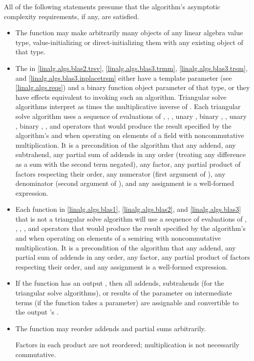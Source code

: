 \pnum
All of the following statements presume
that the algorithm's asymptotic complexity requirements, if any, are satisfied.
\begin{itemize}
\item
The function may make arbitrarily many objects of any linear algebra value type,
value-initializing or direct-initializing them
with any existing object of that type.
\item
The  in
\ref{linalg.algs.blas2.trsv},
\ref{linalg.algs.blas3.trmm},
\ref{linalg.algs.blas3.trsm}, and
\ref{linalg.algs.blas3.inplacetrsm}
either have
a  template parameter (see \ref{linalg.algs.reqs}) and
a binary function object parameter  of that type,
or they have effects equivalent to invoking such an algorithm.
Triangular solve algorithms interpret  as
 times the multiplicative inverse of .
Each triangular solve algorithm uses a sequence of evaluations of
\tcode{*}, \tcode{*=}, ,
unary \tcode{+}, binary \tcode{+}, \tcode{+=},
unary \tcode{-}, binary \tcode{-}, \tcode{-=},
and \tcode{=} operators
that would produce the result
specified by the algorithm's  and 
when operating on elements of a field with noncommutative multiplication.
It is a precondition of the algorithm that
any addend,
any subtrahend,
any partial sum of addends in any order
(treating any difference as a sum with the second term negated),
any factor,
any partial product of factors respecting their order,
any numerator (first argument of ),
any denominator (second argument of ),
and any assignment
is a well-formed expression.
\item
Each function in
\ref{linalg.algs.blas1}, \ref{linalg.algs.blas2}, and \ref{linalg.algs.blas3}
that is not a triangular solve algorithm
will use a sequence of evaluations of
\tcode{*}, \tcode{*=}, \tcode{+}, \tcode{+=}, and \tcode{=} operators
that would produce the result
specified by the algorithm's  and 
when operating on elements of a semiring with noncommutative multiplication.
It is a precondition of the algorithm that
any addend,
any partial sum of addends in any order,
any factor,
any partial product of factors respecting their order,
and any assignment
is a well-formed expression.
\item
If the function has an output ,
then all addends,
subtrahends (for the triangular solve algorithms),
or results of the  parameter on intermediate terms
(if the function takes a  parameter)
are assignable and convertible to
the output 's .
\item
The function may reorder addends and partial sums arbitrarily.
\begin{note}
Factors in each product are not reordered;
multiplication is not necessarily commutative.
\end{note}
\end{itemize}
